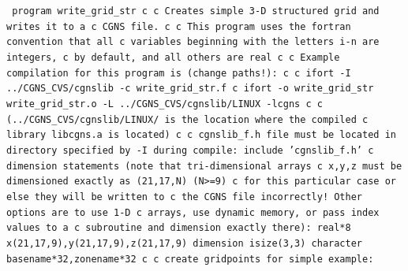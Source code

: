 \documentclass[12pt]{article}
\begin{document}
{\tt 
\indent       program write\_grid\_str
\newline c
\newline c   Creates simple 3-D structured grid and writes it to a
\newline c   CGNS file.
\newline c
\newline c   This program uses the fortran convention that all
\newline c   variables beginning with the letters i-n are integers,
\newline c   by default, and all others are real
\newline c
\newline c   Example compilation for this program is (change paths!):
\newline c
\newline c   ifort -I ../CGNS\_CVS/cgnslib -c write\_grid\_str.f
\newline c   ifort -o write\_grid\_str write\_grid\_str.o -L ../CGNS\_CVS/cgnslib/LINUX -lcgns
\newline c
\newline c   (../CGNS\_CVS/cgnslib/LINUX/ is the location where the compiled
\newline c   library libcgns.a is located)
\newline c
\newline c   cgnslib\_f.h file must be located in directory specified by -I during compile:
\newline\indent      include 'cgnslib\_f.h'
\newline c   dimension statements (note that tri-dimensional arrays
\newline c   x,y,z must be dimensioned exactly as (21,17,N) (N>=9)
\newline c   for this particular case or else they will be written to
\newline c   the CGNS file incorrectly!  Other options are to use 1-D
\newline c   arrays, use dynamic memory, or pass index values to a
\newline c   subroutine and dimension exactly there):
\newline\indent      real*8 x(21,17,9),y(21,17,9),z(21,17,9)
\newline\indent      dimension isize(3,3)
\newline\indent      character basename*32,zonename*32
\newline c
\newline c   create gridpoints for simple example:
}
\end{document}
